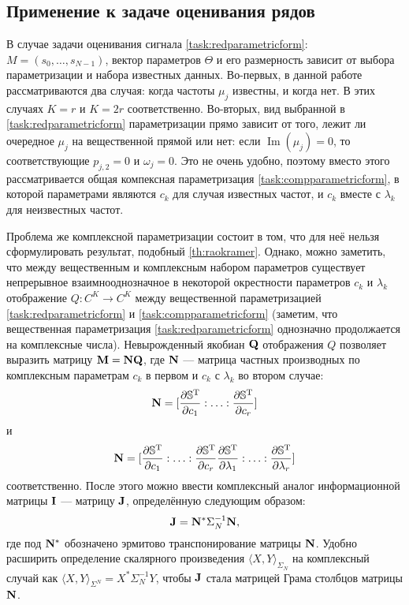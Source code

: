 \documentclass[12pt,a4paper]{article}
\begin{document}
\subsection{Применение к задаче оценивания рядов}
В случае задачи оценивания сигнала \eqref{task:redparametricform}: $M = (s_0, \ldots, s_{N-1})$, вектор параметров $\Theta$ и его размерность зависит от выбора параметризации и набора известных данных. Во-первых, в данной работе рассматриваются два случая: когда частоты $\mu_j$ известны, и когда нет. В этих случаях $K = r$ и $K = 2r$ соответственно. Во-вторых, вид выбранной в \eqref{task:redparametricform} параметризации прямо зависит от того, лежит ли очередное $\mu_j$ на вещественной прямой или нет: если $\operatorname{Im}(\mu_j) = 0$, то соответствующие $p_{j, 2} = 0$ и $\omega_j = 0$. Это не очень удобно, поэтому вместо этого рассматривается общая компексная параметризация \eqref{task:compparametricform}, в которой параметрами являются $c_k$ для случая известных частот, и $c_k$ вместе с $\lambda_k$ для неизвестных частот. 

Проблема же комплексной параметризации состоит в том, что для неё нельзя сформулировать результат, подобный \ref{th:raokramer}. Однако, можно заметить, что между вещественным и комплексным набором параметров существует непрерывное взаимнооднозначное в некоторой окрестности параметров $c_k$ и $\lambda_k$ отображение $Q:C^K \to C^K$ между вещественной параметризацией \eqref{task:redparametricform} и \eqref{task:compparametricform} (заметим, что вещественная параметризация \eqref{task:redparametricform} однозначно продолжается на комплексные числа). Невырожденный якобиан $\mathbf{Q}$ отображения $Q$ позволяет выразить матрицу $\mathbf{M} = \mathbf{N} \mathbf{Q}$, где $\mathbf{N}$ --- матрица частных производных по комплексным параметрам $c_k$ в первом и $c_k$ с $\lambda_k$ во втором случае: 
\begin{equation}\label{eq:Nwolambdas}
\mathbf{N} = [\frac{\partial \mathbb{S}^{\mathrm{T}}}{\partial c_1}:\ldots:\frac{\partial \mathbb{S}^{\mathrm{T}}}{\partial c_r}]
\end{equation}
и 
\begin{equation}\label{eq:N}
\mathbf{N} = [\frac{\partial \mathbb{S}^{\mathrm{T}}}{\partial c_1}:\ldots:\frac{\partial \mathbb{S}^{\mathrm{T}}}{\partial c_r}\frac{\partial \mathbb{S}^{\mathrm{T}}}{\partial \lambda_1}:\ldots:\frac{\partial \mathbb{S}^{\mathrm{T}}}{\partial \lambda_r}]
\end{equation}
соответственно. После этого можно ввести комплексный аналог информационной матрицы $\mathbf{I}$ --- матрицу $\mathbf{J}$, определённую следующим образом:
\begin{equation}\label{eq:J}
\mathbf{J} = \mathbf{N}^* \Sigma_N^{-1} \mathbf{N},
\end{equation}
где под $\mathbf{N}^*$ обозначено эрмитово транспонирование матрицы $\mathbf{N}$. Удобно расширить определение скалярного произведения $\langle X, Y \rangle_{\Sigma_N}$ на комплексный случай как $\langle X, Y \rangle_{\Sigma^N} = X^* \Sigma_N^{-1} Y$, чтобы $\mathbf{J}$ стала матрицей Грама столбцов матрицы $\mathbf{N}$.
\end{document}
